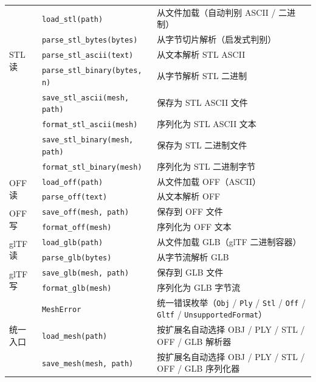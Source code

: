 \documentclass[11pt,a4paper]{article}
\begin{document}
\begin{center}
\begin{tabular}{@{}lll@{}}
  \midrule
  \multirow{5}{*}{STL 读}
    & \texttt{load\_stl(path)}                  & 从文件加载（自动判别 ASCII / 二进制） \\
    & \texttt{parse\_stl\_bytes(bytes)}         & 从字节切片解析（启发式判别） \\
    & \texttt{parse\_stl\_ascii(text)}          & 从文本解析 STL ASCII \\
    & \texttt{parse\_stl\_binary(bytes, n)}     & 从字节解析 STL 二进制 \\
  \midrule
  \multirow{4}{*}{STL 写}
    & \texttt{save\_stl\_ascii(mesh, path)}     & 保存为 STL ASCII 文件 \\
    & \texttt{format\_stl\_ascii(mesh)}         & 序列化为 STL ASCII 文本 \\
    & \texttt{save\_stl\_binary(mesh, path)}    & 保存为 STL 二进制文件 \\
    & \texttt{format\_stl\_binary(mesh)}        & 序列化为 STL 二进制字节 \\
  \midrule
  \multirow{2}{*}{OFF 读}
    & \texttt{load\_off(path)}    & 从文件加载 OFF（ASCII） \\
    & \texttt{parse\_off(text)}   & 从文本解析 OFF \\
  \midrule
  \multirow{2}{*}{OFF 写}
    & \texttt{save\_off(mesh, path)} & 保存到 OFF 文件 \\
    & \texttt{format\_off(mesh)}     & 序列化为 OFF 文本 \\
  \midrule
  \multirow{2}{*}{glTF 读}
    & \texttt{load\_glb(path)}    & 从文件加载 GLB（glTF 二进制容器） \\
    & \texttt{parse\_glb(bytes)}  & 从字节流解析 GLB \\
  \midrule
  \multirow{2}{*}{glTF 写}
    & \texttt{save\_glb(mesh, path)} & 保存到 GLB 文件 \\
    & \texttt{format\_glb(mesh)}     & 序列化为 GLB 字节流 \\
  \midrule
  \multirow{3}{*}{统一入口}
    & \texttt{MeshError}                            & 统一错误枚举（\texttt{Obj} / \texttt{Ply} / \texttt{Stl} / \texttt{Off} / \texttt{Gltf} / \texttt{UnsupportedFormat}） \\
    & \texttt{load\_mesh(path)}                     & 按扩展名自动选择 OBJ / PLY / STL / OFF / GLB 解析器 \\
    & \texttt{save\_mesh(mesh, path)}               & 按扩展名自动选择 OBJ / PLY / STL / OFF / GLB 序列化器 \\
  \bottomrule
\end{tabular}
\end{center}
\end{document}
